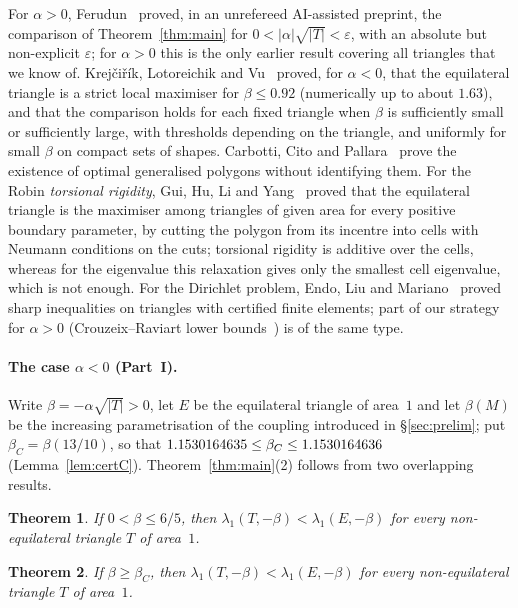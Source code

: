 \documentclass[11pt]{article}
\newtheorem{theorem}{Theorem}[section]
\theoremstyle{remark}
\newcommand{\E}{E}
\begin{document}
For $\alpha>0$, Ferudun~\cite{Ferudun} proved, in an unrefereed AI-assisted preprint, the comparison of
Theorem~\ref{thm:main} for $0<|\alpha|\sqrt{|T|}<\varepsilon$, with an absolute but non-explicit
$\varepsilon$; for $\alpha>0$ this is the only earlier result covering all triangles that we know of.
Krej\v{c}i\v{r}\'{i}k, Lotoreichik and Vu~\cite{KLV} proved, for $\alpha<0$, that the equilateral
triangle is a strict local maximiser for $\beta\le0.92$ (numerically up to about $1.63$), and that the
comparison holds for each fixed triangle when $\beta$ is sufficiently small or sufficiently large, with
thresholds depending on the triangle, and uniformly for small $\beta$ on compact sets of shapes.
Carbotti, Cito and Pallara~\cite{CCP} prove the existence of optimal generalised polygons without
identifying them. For the Robin \emph{torsional rigidity}, Gui, Hu, Li and Yang~\cite{GHLY} proved that
the equilateral triangle is the maximiser among triangles of given area for every positive boundary
parameter, by cutting the polygon from its incentre into cells with Neumann conditions on the cuts;
torsional rigidity is additive over the cells, whereas for the eigenvalue this relaxation gives only the
smallest cell eigenvalue, which is not enough. For the Dirichlet problem, Endo, Liu and
Mariano~\cite{ELM} proved sharp inequalities on triangles with certified finite elements; part of our
strategy for $\alpha>0$ (Crouzeix--Raviart lower bounds~\cite{CR,Liu,CG}) is of the same type.

\paragraph{The case $\alpha<0$ (Part~I).} Write $\beta=-\alpha\sqrt{|T|}>0$, let $\E$ be the equilateral
triangle of area~$1$ and let $\beta(M)$ be the increasing parametrisation of the coupling introduced in
\S\ref{sec:prelim}; put $\beta_C=\beta(13/10)$, so that $1.1530164635\le\beta_C\le1.1530164636$
(Lemma~\ref{lem:certC}). Theorem~\ref{thm:main}(2) follows from two overlapping results.

\begin{theorem}\label{thm:A}
If $0<\beta\le6/5$, then $\lambda_1(T,-\beta)<\lambda_1(\E,-\beta)$ for every non-equilateral triangle $T$
of area~$1$.
\end{theorem}

\begin{theorem}\label{thm:C}
If $\beta\ge\beta_C$, then $\lambda_1(T,-\beta)<\lambda_1(\E,-\beta)$ for every non-equilateral triangle
$T$ of area~$1$.
\end{theorem}
\end{document}
